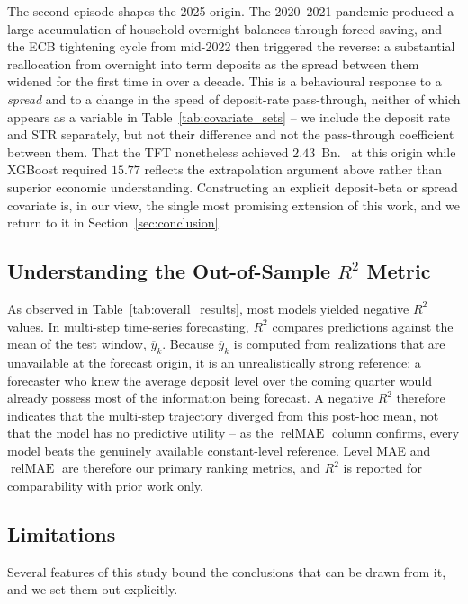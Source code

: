 \documentclass[11pt,a4paper]{article}
\newcommand{\estr}{\mbox{\texteuro STR}}
\begin{document}
The second episode shapes the 2025 origin. The 2020--2021 pandemic produced a
large accumulation of household overnight balances through forced saving, and
the ECB tightening cycle from mid-2022 then triggered the reverse: a
substantial reallocation from overnight into term deposits as the spread
between them widened for the first time in over a decade. This is a
behavioural response to a \emph{spread} and to a change in the speed of
deposit-rate pass-through, neither of which appears as a variable in
Table~\ref{tab:covariate_sets} -- we include the deposit rate and \estr{}
separately, but not their difference and not the pass-through coefficient
between them. That the TFT nonetheless achieved $2.43$~Bn.~\texteuro{} at this
origin while XGBoost required $15.77$ reflects the extrapolation argument
above rather than superior economic understanding. Constructing an explicit
deposit-beta or spread covariate is, in our view, the single most promising
extension of this work, and we return to it in
Section~\ref{sec:conclusion}.

\subsection{Understanding the Out-of-Sample $R^2$ Metric}
As observed in Table~\ref{tab:overall_results}, most models yielded negative
$R^2$ values. In multi-step time-series forecasting, $R^2$ compares
predictions against the mean of the test window, $\overline{y}_k$. Because
$\overline{y}_k$ is computed from realizations that are unavailable at the
forecast origin, it is an unrealistically strong reference: a forecaster who
knew the average deposit level over the coming quarter would already possess
most of the information being forecast. A negative $R^2$ therefore indicates
that the multi-step trajectory diverged from this post-hoc mean, not that the
model has no predictive utility -- as the $\operatorname{relMAE}$ column
confirms, every model beats the genuinely available constant-level reference.
Level MAE and $\operatorname{relMAE}$ are therefore our primary ranking
metrics, and $R^2$ is reported for comparability with prior work only.

\subsection{Limitations}
\label{subsec:limitations}

Several features of this study bound the conclusions that can be drawn from
it, and we set them out explicitly.
\end{document}
